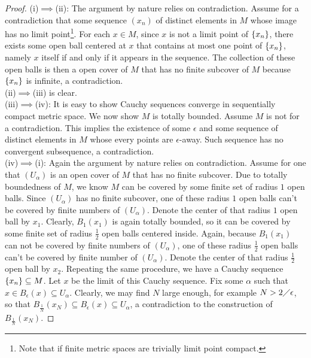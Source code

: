 \documentclass{report}
\begin{document}
\begin{proof}
(i)$\implies $(ii): The argument by nature relies on contradiction. Assume for a contradiction that some sequence  $(x_n)$ of distinct elements in $M$ whose image has no limit point\footnote{Note that if finite metric spaces are trivially limit point compact.}. For each $x \in M$, since $x$ is not a limit point of  $\left\{ x_n \right\}$, there exists some open ball centered at $x$ that contains at most one point of $\left\{ x_n \right\}$, namely $x$ itself if and only if it appears in the sequence. The collection of these open balls is then a open cover of $M$ that has no finite subcover of  $M$ because  $\left\{ x_n \right\}$ is infinite, a contradiction. \\

 (ii)$\implies $(iii) is clear. \\

 (iii)$\implies $(iv): It is easy to show Cauchy sequences converge in sequentially compact metric space. We now show $M$ is totally bounded. Assume $M$ is not for a contradiction. This implies the existence of some $\epsilon $ and some sequence of distinct elements in $M$ whose every points are  $\epsilon $-away. Such sequence has no convergent subsequence, a contradiction. \\

 (iv)$\implies $(i): Again the argument by nature relies on contradiction. Assume for one that $(U_\alpha )$ is an open cover of $M$ that has no finite subcover. Due to totally boundedness of $M$, we know $M$ can be covered by some finite set of radius $1$ open balls. Since $(U_\alpha )$ has no finite subcover, one of these radius $1$ open balls can't be covered by finite numbers of $(U_\alpha) $. Denote the center of that radius  $1$ open ball by  $x_1$. Clearly,  $B_1(x_1)$ is again totally bounded, so it can be covered by some finite set of radius $\frac{1}{2}$ open balls centered inside. Again, because $B_1(x_1)$ can not be covered by finite numbers of $(U_\alpha) $, one of these radius $\frac{1}{2}$ open balls can't be covered by finite number of $(U_\alpha) $. Denote the center of that radius $\frac{1}{2}$ open ball by $x_2$. Repeating the same procedure, we have a Cauchy sequence  $\left\{ x_n \right\}\subseteq M$. Let $x$ be the limit of this Cauchy sequence. Fix some $\alpha $ such that $x \in B_\epsilon (x)\subseteq U_\alpha $. Clearly, we may find $N$ large enough, for example $N>2\diagup \epsilon $, so that $B_{\frac{1}{N}}(x_N)\subseteq B_\epsilon (x)\subseteq U_\alpha $, a contradiction to the construction of $B_{\frac{1}{N}}(x_N)$.  
\end{proof}
\end{document}
